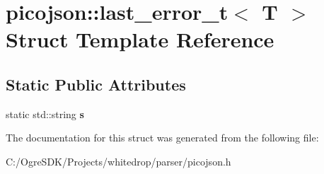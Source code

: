 \hypertarget{structpicojson_1_1last__error__t}{\section{picojson\+:\+:last\+\_\+error\+\_\+t$<$ T $>$ Struct Template Reference}
\label{structpicojson_1_1last__error__t}
}
\subsection*{Static Public Attributes}
\begin{DoxyCompactItemize}
\item 
\hypertarget{structpicojson_1_1last__error__t_a270361f4321424bfd800c36607bf0411}{static std\+::string {\bfseries s}}\label{structpicojson_1_1last__error__t_a270361f4321424bfd800c36607bf0411}

\end{DoxyCompactItemize}


The documentation for this struct was generated from the following file\+:\begin{DoxyCompactItemize}
\item 
C\+:/\+Ogre\+S\+D\+K/\+Projects/whitedrop/parser/picojson.\+h\end{DoxyCompactItemize}
